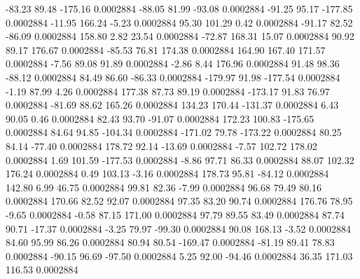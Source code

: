       -83.23       89.48     -175.16     0.0002884
      -88.05       81.99      -93.08     0.0002884
      -91.25       95.17     -177.85     0.0002884
      -11.95      166.24       -5.23     0.0002884
       95.30      101.29        0.42     0.0002884
      -91.17       82.52      -86.09     0.0002884
      158.80        2.82       23.54     0.0002884
      -72.87      168.31       15.07     0.0002884
       90.92       89.17      176.67     0.0002884
      -85.53       76.81      174.38     0.0002884
      164.90      167.40      171.57     0.0002884
       -7.56       89.08       91.89     0.0002884
       -2.86        8.44      176.96     0.0002884
       91.48       98.36      -88.12     0.0002884
       84.49       86.60      -86.33     0.0002884
     -179.97       91.98     -177.54     0.0002884
       -1.19       87.99        4.26     0.0002884
      177.38       87.73       89.19     0.0002884
     -173.17       91.83       76.97     0.0002884
      -81.69       88.62      165.26     0.0002884
      134.23      170.44     -131.37     0.0002884
        6.43       90.05        0.46     0.0002884
       82.43       93.70      -91.07     0.0002884
      172.23      100.83     -175.65     0.0002884
       84.64       94.85     -104.34     0.0002884
     -171.02       79.78     -173.22     0.0002884
       80.25       84.14      -77.40     0.0002884
      178.72       92.14      -13.69     0.0002884
       -7.57      102.72      178.02     0.0002884
        1.69      101.59     -177.53     0.0002884
       -8.86       97.71       86.33     0.0002884
       88.07      102.32      176.24     0.0002884
        0.49      103.13       -3.16     0.0002884
      178.73       95.81      -84.12     0.0002884
      142.80        6.99       46.75     0.0002884
       99.81       82.36       -7.99     0.0002884
       96.68       79.49       80.16     0.0002884
      170.66       82.52       92.07     0.0002884
       97.35       83.20       90.74     0.0002884
      176.76       78.95       -9.65     0.0002884
       -0.58       87.15      171.00     0.0002884
       97.79       89.55       83.49     0.0002884
       87.74       90.71      -17.37     0.0002884
       -3.25       79.97      -99.30     0.0002884
       90.08      168.13       -3.52     0.0002884
       84.60       95.99       86.26     0.0002884
       80.94       80.54     -169.47     0.0002884
      -81.19       89.41       78.83     0.0002884
      -90.15       96.69      -97.50     0.0002884
        5.25       92.00      -94.46     0.0002884
       36.35      171.03      116.53     0.0002884
